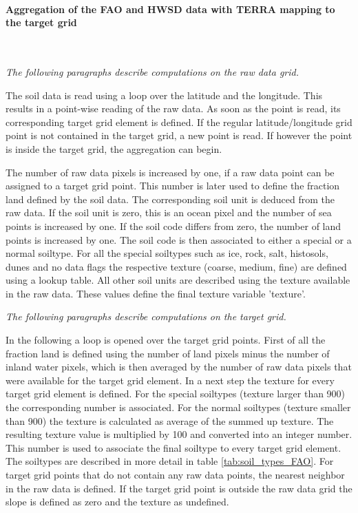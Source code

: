 \documentclass[a4paper,10pt,DIV14,BCOR1cm,titlepage,twoside]{scrartcl}
\begin{document}
\paragraph{Aggregation of the FAO and HWSD data with TERRA mapping to the target grid}\ \par\medskip\noindent
\textit{The following paragraphs describe computations on the raw data grid.}\par\medskip\noindent
The soil data is read using a loop over the latitude and the longitude. This results in a point-wise reading of the raw data. As soon as the point is read, its corresponding target grid element is defined. If the regular latitude/longitude grid point is not contained in the target grid, a new point is read. If however the point is inside the target grid, the aggregation can begin. \par\medskip\noindent
The number of raw data pixels is increased by one, if a raw data point can be assigned to a target grid point. This number is later used to define the fraction land defined by the soil data. The corresponding soil unit is deduced from the raw data. If the soil unit is zero, this is an ocean pixel and the number of sea points is increased by one. If the soil code differs from zero, the number of land points is increased by one. The soil code is then associated to either a special or a normal soiltype. For all the special soiltypes such as ice, rock, salt, histosols, dunes and no data flags the respective texture (coarse, medium, fine) are defined using a lookup table. All other soil units are described using the texture available in the raw data. These values define the final texture variable 'texture'. \par\medskip\noindent
\textit{The following paragraphs describe computations on the target grid.} \par\medskip\noindent
In the following a loop is opened over the target grid points. First of all the fraction land is defined using the number of land pixels minus the number of inland water pixels, which is then averaged by the number of raw data pixels that were available for the target grid element. In a next step the texture for every target grid element is defined. For the special soiltypes (texture larger than 900) the corresponding number is associated. For the normal soiltypes (texture smaller than 900) the texture is calculated as average of the summed up texture. The resulting texture value is multiplied by 100 and converted into an integer number. This number is used to associate the final soiltype to every target grid element. The soiltypes are described in more detail in table \ref{tab:soil_types_FAO}. For target grid points that do not contain any raw data points, the nearest neighbor in the raw data is defined. If the target grid point is outside the raw data grid the slope is defined as zero and the texture as undefined.\par\medskip\newpage
\end{document}

